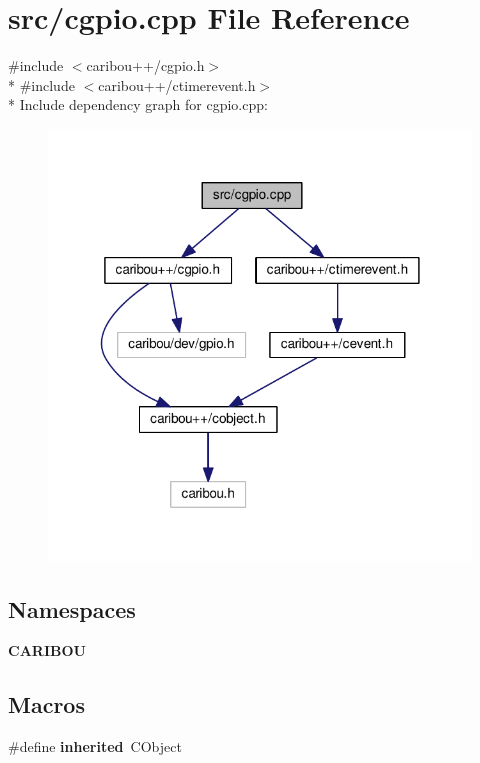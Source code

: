 \section{src/cgpio.cpp File Reference}
\label{cgpio_8cpp}
{\ttfamily \#include $<$caribou++/cgpio.\+h$>$}\\*
{\ttfamily \#include $<$caribou++/ctimerevent.\+h$>$}\\*
Include dependency graph for cgpio.\+cpp\+:
\nopagebreak
\begin{figure}[H]
\begin{center}
\leavevmode
\includegraphics[width=318pt]{cgpio_8cpp__incl}
\end{center}
\end{figure}
\subsection*{Namespaces}
\begin{DoxyCompactItemize}
\item 
 {\bf C\+A\+R\+I\+B\+OU}
\end{DoxyCompactItemize}
\subsection*{Macros}
\begin{DoxyCompactItemize}
\item 
\#define {\bf inherited}~C\+Object
\end{DoxyCompactItemize}


